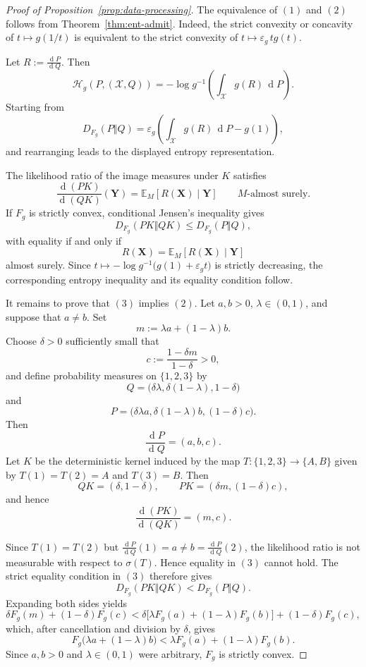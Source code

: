 \documentclass[10pt,a4paper]{amsart}
\def\dd{{\operatorname{d}}}
\begin{document}
\begin{proof}[Proof of Proposition~\ref{prop:data-processing}]
The equivalence of $(1)$ and $(2)$ follows from
Theorem~\ref{thm:ent-admit}. Indeed, the strict convexity or concavity of
$t\mapsto g(1/t)$ is equivalent
to the strict convexity of
$t\mapsto \varepsilon_g\,tg(t)$.

Let $R:=\frac{\dd P}{\dd Q}$. 
Then 
$$
\mathcal H_g(P,(\mathcal X,Q))
=
-\log g^{-1}
\left( \int_{\mathcal X}g(R)\,\dd P
\right).
$$
Starting from
$$
D_{F_g}(P\Vert Q)
=
\varepsilon_g
\left(
\int_{\mathcal X}g(R)\,\dd P-g(1)
\right),
$$
and rearranging leads to the displayed entropy representation.


The likelihood ratio of the image measures under $K$ satisfies
$$
\frac{\dd (PK)}{\dd (QK)}(\mathbf{Y})
=
\mathbb E_{M}[R(\mathbf{X})\mid \mathbf{Y}] 
\qquad M\text{-almost surely}.
$$
If $F_g$ is strictly convex, conditional Jensen's inequality gives
$$
D_{F_g}(PK\Vert QK)
\leq
D_{F_g}(P\Vert Q),
$$
with equality if and only if
$$
R(\mathbf{X})=\mathbb E_{M}[R(\mathbf{X})\mid \mathbf{Y}]
$$
almost surely. Since $t \mapsto
-\log g^{-1}\bigl(g(1)+\varepsilon_g t\bigr)$ is strictly decreasing, the corresponding entropy inequality and its
equality condition follow.

It remains to prove that $(3)$ implies $(2)$. Let $a,b>0$,
$\lambda\in(0,1)$, and suppose that $a\neq b$. Set
$$
m:=\lambda a+(1-\lambda)b.
$$
Choose $\delta>0$ sufficiently small that
$$
c:=\frac{1-\delta m}{1-\delta}>0,
$$
and define probability measures on $\{1,2,3\}$ by
$$
Q=
\bigl(\delta \lambda,\delta(1-\lambda),1-\delta\bigr)
$$
and
$$
P=
\bigl(\delta\lambda a,\delta(1-\lambda)b,(1-\delta)c\bigr).
$$
Then
$$
\frac{\dd P}{\dd Q}=(a,b,c).
$$
Let $K$ be the deterministic kernel induced by the map
$T:\{1,2,3\}\to\{A,B\}$ given by
$T(1)=T(2)=A$ and $T(3)=B$. Then
$$
QK=(\delta,1-\delta),
\qquad
PK=(\delta m,(1-\delta)c),
$$
and hence
$$
\frac{\dd(PK)}{\dd(QK)}=(m,c).
$$

Since $T(1)=T(2)$ but $\frac{\dd P}{\dd Q}(1)=a\neq b
=\frac{\dd P}{\dd Q}(2)$,
the likelihood ratio is not measurable with respect to
$\sigma(T)$. Hence equality in $(3)$ cannot hold. 
The strict equality
condition in $(3)$ therefore gives
$$
D_{F_g}(PK\Vert QK)<D_{F_g}(P\Vert Q).
$$
Expanding both sides yields
$$
\delta F_g(m)+(1-\delta)F_g(c)
<
\delta\bigl[\lambda F_g(a)+(1-\lambda)F_g(b)\bigr]
+(1-\delta)F_g(c),
$$
which, after cancellation and division by $\delta$, gives
$$
F_g\bigl(\lambda a+(1-\lambda)b\bigr)
<
\lambda F_g(a)+(1-\lambda)F_g(b).
$$
Since $a,b>0$ and $\lambda\in(0,1)$ were arbitrary, $F_g$ is strictly
convex.
\end{proof}
\end{document}
